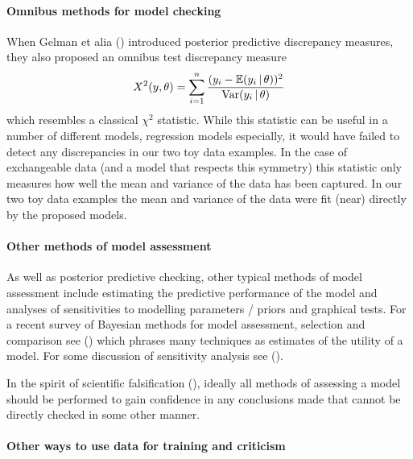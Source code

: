 \documentclass{article} %
\begin{document}
\paragraph{Omnibus methods for model checking}

When Gelman et alia () introduced posterior predictive discrepancy measures, they also proposed an omnibus test discrepancy measure
\begin{equation}
  X^2(y,\theta) = \sum_{i=1}^n \frac{(y_i-\mathbb{E}(y_i\,|\,\theta))^2}{\textrm{Var}(y_i\,|\,\theta)}
\end{equation}
which resembles a classical $\chi^2$ statistic.
While this statistic can be useful in a number of different models, regression models especially, it would have failed to detect any discrepancies in our two toy data examples.
In the case of exchangeable data (and a model that respects this symmetry) this statistic only measures how well the mean and variance of the data has been captured.
In our two toy data examples the mean and variance of the data were fit (near) directly by the proposed models.

\paragraph{Other methods of model assessment}

As well as posterior predictive checking, other typical methods of model assessment include estimating the predictive performance of the model and analyses of sensitivities to modelling parameters / priors and graphical tests.
For a recent survey of Bayesian methods for model assessment, selection and comparison see () which phrases many techniques as estimates of the utility of a model.
For some discussion of sensitivity analysis see ().

In the spirit of scientific falsification (), ideally all methods of assessing a model should be performed to gain confidence in any conclusions made that cannot be directly checked in some other manner.


\paragraph{Other ways to use data for training and criticism}
\end{document}
